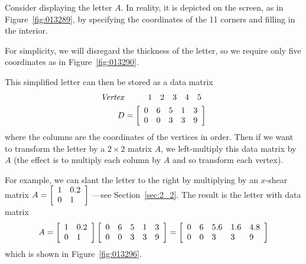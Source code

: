Consider displaying the letter $A$. In reality, it is depicted on the screen, as in Figure~\ref{fig:013289},
 by specifying the coordinates of the 11 corners and filling in the 
interior.

 For simplicity, we will disregard the thickness of the letter,
 so we require only five coordinates as in Figure~\ref{fig:013290}. 

This simplified letter can then be stored as a data matrix
\begin{align*}
\mbox{\textit{Vertex}} & 
\ \ \ \ \ \ \ \begin{array}{rrrrr}
1 & 2 & 3 & 4 & 5
\end{array} \\
D &= \left[
\begin{array}{rrrrr}
0 & 6 & 5 & 1 & 3\\
0 & 0 & 3 & 3 & 9
\end{array}
\right]
\end{align*}
where the columns are the coordinates of the vertices in order. Then if we want to transform the letter by a $2 \times 2$ matrix $A$, we left-multiply this data matrix by $A$ (the effect is to multiply each column by $A$ and so transform each vertex).

For example, we can slant the letter to the right by multiplying by an $x$-shear matrix $A = \left[
\begin{array}{ll}
1 & 0.2\\
0 & 1\\
\end{array}
\right]$
 ---see Section~\ref{sec:2_2}. The result is the letter with data matrix
\begin{equation*}
A = \left[
\begin{array}{ll}
1 & 0.2\\
0 & 1
\end{array}
\right] \left[
\begin{array}{rrrrr}
0 & 6 & 5 & 1 & 3\\
0 & 0 & 3 & 3 & 9
\end{array}
\right] = 
 \left[
\begin{array}{lllll}
0 & 6 & 5.6 & 1.6 & 4.8\\
0 & 0 & 3 & 3 & 9
\end{array}
\right]
\end{equation*}
which is shown in Figure~\ref{fig:013296}.

